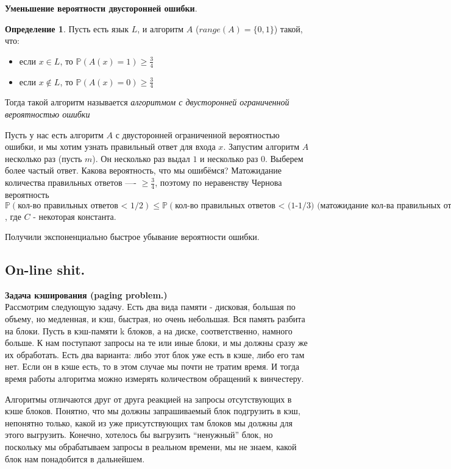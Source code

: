\documentclass[a4paper]{article}
\theoremstyle{indented}
\theoremstyle{definition}
\newtheorem{defn}{Определение}
\theoremstyle{remark}
\begin{document}
\textbf{Уменьшение вероятности двусторонней ошибки}.
\begin{defn}
Пусть есть язык $L$, и алгоритм $A$ ($range(A)=\{0, 1\}$) такой, что:
\begin{itemize}
\item если $x \in L$, то $\mathbb{P}(A(x)=1) \geq \frac{3}{4}$
\item если $x \notin L$, то $\mathbb{P}(A(x)=0) \geq \frac{3}{4}$
\end{itemize}
Тогда такой алгоритм называется \textit{алгоритмом с двусторонней ограниченной вероятностью ошибки}
\end{defn}
Пусть у нас есть алгоритм $A$ с двусторонней ограниченной вероятностью ошибки, и мы хотим узнать правильный ответ для входа $x$. Запустим алгоритм $A$ несколько раз (пусть $m$). Он несколько раз выдал $1$ и несколько раз $0$. Выберем более частый ответ. Какова вероятность, что мы ошибёмся? Матожидание количества правильных ответов —- $\geq \frac{3}{4}$, поэтому по неравенству Чернова вероятность $\mathbb{P}(\text{кол-во правильных ответов < 1/2}) \leq \mathbb{P}(\text{кол-во правильных ответов < (1-1/3) (матожидание кол-ва правильных ответов)}) \leq e^{Cn}$, где $C$ - некоторая константа.
 
Получили экспоненциально быстрое убывание вероятности ошибки.

\subsection{On-line shit.}

\textbf{Задача кэширования (paging problem.)} 
\\ 

Рассмотрим следующую задачу. 
Есть два вида памяти - дисковая, большая по объему, но медленная, 
и кэш, быстрая, но очень небольшая. Вся память разбита на блоки. 
Пусть в кэш-памяти k блоков, а на диске, соответственно, намного больше. 
К нам поступают запросы на те или иные блоки, 
и мы должны сразу же их обработать. 
Есть два варианта: либо этот блок уже есть в кэше, либо его там нет. 
Если он в кэше есть, то в этом случае мы почти не тратим время. 
И тогда время работы алгоритма можно измерять количеством обращений 
к винчестеру. 

Алгоритмы отличаются друг от друга реакцией на запросы отсутствующих 
в кэше блоков. Понятно, что мы должны запрашиваемый блок подгрузить в кэш, 
непонятно только, какой из уже присутствующих там блоков мы должны для этого 
выгрузить. Конечно, хотелось бы выгрузить ``ненужный'' блок, но поскольку мы 
обрабатываем запросы в реальном времени, мы не знаем, какой блок нам 
понадобится в дальнейшем. 
\end{document}
